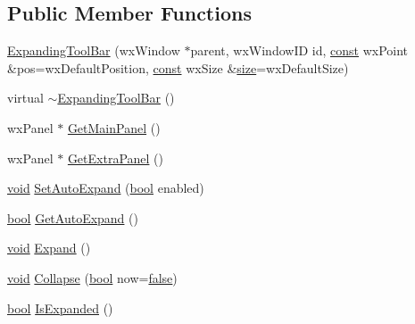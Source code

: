 \subsection*{Public Member Functions}
\begin{DoxyCompactItemize}
\item 
\hyperlink{class_expanding_tool_bar_ad1dc9d80b11f61df0f9761c55d5aa33d}{Expanding\+Tool\+Bar} (wx\+Window $\ast$parent, wx\+Window\+ID id, \hyperlink{getopt1_8c_a2c212835823e3c54a8ab6d95c652660e}{const} wx\+Point \&pos=wx\+Default\+Position, \hyperlink{getopt1_8c_a2c212835823e3c54a8ab6d95c652660e}{const} wx\+Size \&\hyperlink{group__lavu__mem_ga854352f53b148adc24983a58a1866d66}{size}=wx\+Default\+Size)
\item 
virtual \hyperlink{class_expanding_tool_bar_a8f1e8081c79c18fd0392ad4e61361e1b}{$\sim$\+Expanding\+Tool\+Bar} ()
\item 
wx\+Panel $\ast$ \hyperlink{class_expanding_tool_bar_aedc5797fbabfbcb3eae5fa2c9047bea5}{Get\+Main\+Panel} ()
\item 
wx\+Panel $\ast$ \hyperlink{class_expanding_tool_bar_abc1f48c001c6a5a336c31155f3da10ac}{Get\+Extra\+Panel} ()
\item 
\hyperlink{sound_8c_ae35f5844602719cf66324f4de2a658b3}{void} \hyperlink{class_expanding_tool_bar_a8a8ae129974698774b3fb112261aeb53}{Set\+Auto\+Expand} (\hyperlink{mac_2config_2i386_2lib-src_2libsoxr_2soxr-config_8h_abb452686968e48b67397da5f97445f5b}{bool} enabled)
\item 
\hyperlink{mac_2config_2i386_2lib-src_2libsoxr_2soxr-config_8h_abb452686968e48b67397da5f97445f5b}{bool} \hyperlink{class_expanding_tool_bar_aad3eff9b873267f974fefc70d93b9d45}{Get\+Auto\+Expand} ()
\item 
\hyperlink{sound_8c_ae35f5844602719cf66324f4de2a658b3}{void} \hyperlink{class_expanding_tool_bar_a6af8b633e544373404590894dec86904}{Expand} ()
\item 
\hyperlink{sound_8c_ae35f5844602719cf66324f4de2a658b3}{void} \hyperlink{class_expanding_tool_bar_ae49c13d1e043a9993e31e9790ffbd373}{Collapse} (\hyperlink{mac_2config_2i386_2lib-src_2libsoxr_2soxr-config_8h_abb452686968e48b67397da5f97445f5b}{bool} now=\hyperlink{mac_2config_2i386_2lib-src_2libsoxr_2soxr-config_8h_a65e9886d74aaee76545e83dd09011727}{false})
\item 
\hyperlink{mac_2config_2i386_2lib-src_2libsoxr_2soxr-config_8h_abb452686968e48b67397da5f97445f5b}{bool} \hyperlink{class_expanding_tool_bar_aa28e13f8f6eca9aae7043cb31d12e9da}{Is\+Expanded} ()
\item 

\end{DoxyCompactItemize}
